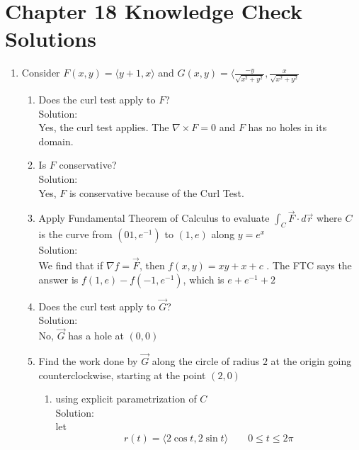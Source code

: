 \documentclass[11pt]{article}
\begin{document}
\section{Chapter 18 Knowledge Check Solutions}
\begin{enumerate}
  \item Consider $F(x,y) = \langle y + 1, x \rangle$ and $G(x,y) = \langle \frac{-y}{\sqrt{x^{2}+y^{2}}}        , \frac{x}{\sqrt{x^{2}+y^{2}}}$
        \begin{enumerate}
          \item Does the curl test apply to $F$?\\
                Solution: \\
                Yes, the curl test applies. The $\nabla \times F = 0$ and
                $F$ has no holes in its domain.
          \item Is $F$ conservative? \\
                Solution: \\
                Yes, $F$ is conservative because of the Curl Test.
          \item Apply Fundamental Theorem of Calculus to evaluate $\int_{C} \vec{F} \cdot d\vec{r}$
                where $C$ is the curve from $(01, e^{-1})$ to $(1, e)$ along
                $y = e^{x}$\\
                Solution:\\
                We find that if $\nabla f = \vec{F}$, then $f(x,y) = xy + x + c$
                . The FTC says the answer is $f(1,e) - f(-1, e^{-1})$, which is
                $e+e^{-1}+2$
          \item Does the curl test apply to $\vec{G}$?\\
                Solution: \\
                No, $\vec{G}$ has a hole at $(0,0)$
          \item Find the work done by $\vec{G}$ along the circle of radius $2$
                at the origin going counterclockwise, starting at the point $(2,0)$\\
                \begin{enumerate}
                  \item using explicit parametrization of $C$ \\
                        Solution: \\
                        let
                \[r(t) = \langle 2\cos t, 2\sin t \rangle \qquad  0 \le t \le 2\pi\]


\end{enumerate}
\end{enumerate}
\end{enumerate}
\end{document}
